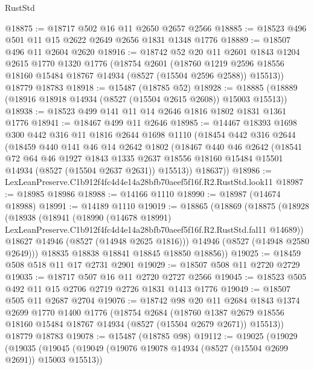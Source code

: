 \begin{lexlean}{RustStd}
\begin{coremodule}
@18875 := @18717 @502 @16 @11 @2650 @2657 @2566
@18885 := @18523 @496 @501 @11 @15 @2622 @2649 @2656 @1831 @1348 @1776
@18889 := @18507 @496 @11 @2604 @2620
@18916 := @18742
    @52
    @20
    @11
    @2601
    @1843
    @1204
    @2615
    @1770
    @1320
    @1776
    (@18754
      @2601
      (@18760 @1219 @2596 @18556 @18160 @15484 @18767 @14934 (@8527 (@15504 @2596 @2588)) @15513))
    @18779
    @18783
@18918 := @15487 (@18785 @52)
@18928 := @18885 (@18889 (@18916 @18918 @14934 (@8527 (@15504 @2615 @2608)) @15003 @15513))
@18938 := @18523 @499 @141 @11 @14 @2646 @1816 @1802 @1831 @1361 @1776
@18941 := @18467 @499 @11 @2646
@18985 := @14467
    @18393
    @1698
    @300
    @442
    @316
    @11
    @1816
    @2644
    @1698
    @1110
    (@18454
      @442
      @316
      @2644
      (@18459
        @440
        @141
        @46
        @14
        @2642
        @1802
        (@18467
          @440
          @46
          @2642
          (@18541
            @72
            @64
            @46
            @1927
            @1843
            @1335
            @2637
            @18556
            @18160
            @15484
            @15501
            @14934
            (@8527 (@15504 @2637 @2631))
            @15513))
        @18637))
@18986 := LexLeanPreserve.C1b912f4fc4d4e14a28bfb70aeef5f16f.R2.RustStd.look11
@18987 := @18985 @18986
@18988 := @14166 @1110
@18990 := @18987 (@14674 @18988)
@18991 := @14189 @1110
@19019 := @18865
    (@18869
      (@18875
        (@18928
          (@18938
            (@18941
              (@18990
                (@14678 @18991)
                LexLeanPreserve.C1b912f4fc4d4e14a28bfb70aeef5f16f.R2.RustStd.fal11
                @14689))
            @18627
            @14946
            (@8527 (@14948 @2625 @1816)))
          @14946
          (@8527 (@14948 @2580 @2649)))
        @18835
        @18838
        @18841
        @18845
        @18850
        @18856))
@19025 := @18459 @508 @518 @11 @17 @2731 @2901
@19029 := @18507 @508 @11 @2720 @2729
@19035 := @18717 @507 @16 @11 @2720 @2727 @2566
@19045 := @18523 @505 @492 @11 @15 @2706 @2719 @2726 @1831 @1413 @1776
@19049 := @18507 @505 @11 @2687 @2704
@19076 := @18742
    @98
    @20
    @11
    @2684
    @1843
    @1374
    @2699
    @1770
    @1400
    @1776
    (@18754
      @2684
      (@18760 @1387 @2679 @18556 @18160 @15484 @18767 @14934 (@8527 (@15504 @2679 @2671)) @15513))
    @18779
    @18783
@19078 := @15487 (@18785 @98)
@19112 := @19025
    (@19029
      (@19035
        (@19045
          (@19049 (@19076 @19078 @14934 (@8527 (@15504 @2699 @2691)) @15003 @15513))

\end{coremodule}
\end{lexlean}
